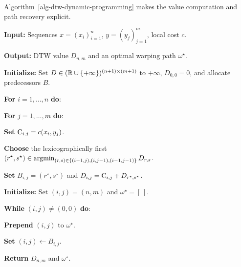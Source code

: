 Algorithm~\ref{alg-dtw-dynamic-programming} makes the value computation and path recovery explicit.

\begin{alg}\label{alg-dtw-dynamic-programming}
\textbf{Input:} Sequences $x=(x_i)_{i=1}^n$, $y=(y_j)_{j=1}^m$, local cost $c$.

\textbf{Output:} DTW value $D_{n,m}$ and an optimal warping path $\omega^\star$.

\textbf{Initialize:} Set $D\in(\mathbb{R}\cup\{+\infty\})^{(n+1)\times(m+1)}$ to $+\infty$, $D_{0,0}=0$, and allocate predecessors $B$.

\textbf{For} $i=1,\ldots,n$ \textbf{do}:
\begin{algblock}
\textbf{For} $j=1,\ldots,m$ \textbf{do}:
\begin{algblock}
\textbf{Set} $\mathrm{C}_{i,j}=c(x_i,y_j)$.

\textbf{Choose} the lexicographically first
$(r^\star,s^\star)\in\operatorname{argmin}_{(r,s)\in\{(i-1,j),(i,j-1),(i-1,j-1)\}}D_{r,s}$.

\textbf{Set} $B_{i,j}=(r^\star,s^\star)$ and $D_{i,j}=\mathrm{C}_{i,j}+D_{r^\star,s^\star}$.
\end{algblock}
\end{algblock}
\textbf{Initialize:} Set $(i,j)=(n,m)$ and $\omega^\star=[\,]$.

\textbf{While} $(i,j)\neq(0,0)$ \textbf{do}:
\begin{algblock}
\textbf{Prepend} $(i,j)$ to $\omega^\star$.

\textbf{Set} $(i,j)\leftarrow B_{i,j}$.
\end{algblock}
\algreturnskip
\textbf{Return} $D_{n,m}$ and $\omega^\star$.
\end{alg}

